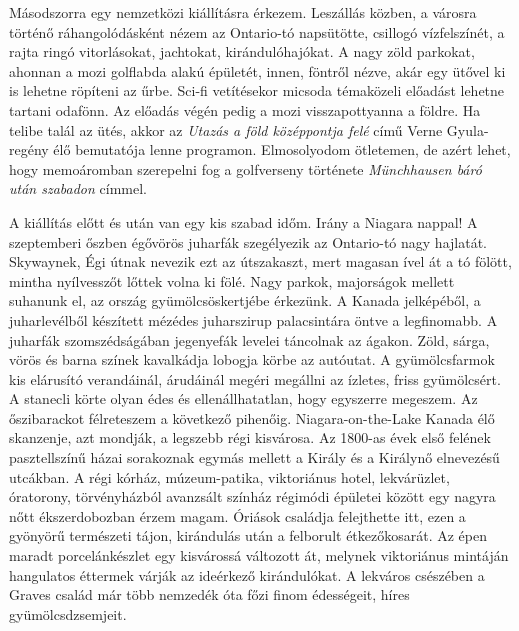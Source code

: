 Másodszorra egy nemzetközi kiállításra érkezem. Leszállás közben,
a városra történő ráhangolódásként nézem az Ontario-tó napsütötte,
csillogó vízfelszínét, a rajta ringó vitorlásokat, jachtokat,
kirándulóhajókat. A nagy zöld parkokat, ahonnan a mozi golflabda
alakú épületét, innen, föntről nézve, akár egy ütővel ki is lehetne
röpíteni az űrbe. Sci-fi vetítésekor micsoda témaközeli előadást
lehetne tartani odafönn. Az előadás végén pedig a mozi visszapottyanna a
földre. Ha telibe talál az ütés, akkor az \textit{Utazás a föld középpontja
felé} című Verne Gyula-regény élő bemutatója lenne programon. Elmosolyodom
ötletemen, de azért lehet, hogy memoáromban szerepelni fog
a golfverseny története \textit{Münchhausen báró után szabadon} címmel.

A kiállítás előtt és után van egy kis szabad időm. Irány a Niagara
nappal! A szeptemberi őszben égővörös juharfák szegélyezik az
Ontario-tó nagy hajlatát. Skywaynek, Égi útnak nevezik ezt az útszakaszt,
mert magasan ível át a tó fölött, mintha nyílvesszőt lőttek
volna ki fölé. Nagy parkok, majorságok mellett suhanunk el, az ország
gyümölcsöskertjébe érkezünk. A Kanada jelképéből, a juharlevélből
készített mézédes juharszirup palacsintára öntve a legfinomabb.
A juharfák szomszédságában jegenyefák levelei táncolnak az
ágakon. Zöld, sárga, vörös és barna színek kavalkádja lobogja körbe
az autóutat. A gyümölcsfarmok kis elárusító verandáinál, árudáinál
megéri megállni az ízletes, friss gyümölcsért. A stanecli körte olyan
édes és ellenállhatatlan, hogy egyszerre megeszem. Az őszibarackot
félreteszem a következő pihenőig. Niagara-on-the-Lake Kanada élő
skanzenje, azt mondják, a legszebb régi kisvárosa. Az 1800-as évek
első felének pasztellszínű házai sorakoznak egymás mellett a Király és
a Királynő elnevezésű utcákban. A régi kórház, múzeum-patika, viktoriánus
hotel, lekvárüzlet, óratorony, törvényházból avanzsált színház
régimódi épületei között egy nagyra nőtt ékszerdobozban érzem
magam. Óriások családja felejthette itt, ezen a gyönyörű természeti
tájon, kirándulás után a felborult étkezőkosarát. Az épen maradt
porcelánkészlet egy kisvárossá változott át, melynek viktoriánus mintáján
hangulatos éttermek várják az ideérkező kirándulókat. A lekváros csészében
a Graves család már több nemzedék óta főzi finom édességeit,
híres gyümölcsdzsemjeit.

